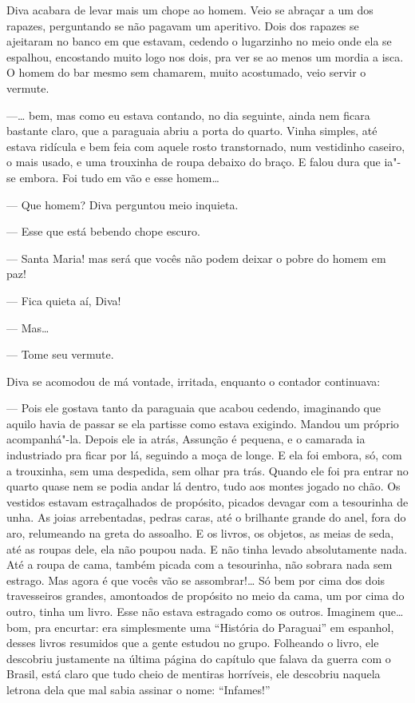 \begin{linenumbers}
Diva acabara de levar mais um chope ao homem. Veio se abraçar a um dos
rapazes, perguntando se não pagavam um aperitivo. Dois dos rapazes se
ajeitaram no banco em que estavam, cedendo o lugarzinho no meio onde ela
se espalhou, encostando muito logo nos dois, pra ver se ao menos um
mordia a isca. O homem do bar mesmo sem chamarem, muito acostumado, veio
servir o vermute.

---\ldots{} bem, mas como eu estava contando, no dia seguinte, ainda nem
ficara bastante claro, que a paraguaia abriu a porta do quarto. Vinha
simples, até estava ridícula e bem feia com aquele rosto transtornado,
num vestidinho caseiro, o mais usado, e uma trouxinha de roupa debaixo
do braço. E falou dura que ia"-se embora. Foi tudo em vão e esse homem\ldots{}

--- Que homem? Diva perguntou meio inquieta.

--- Esse que está bebendo chope escuro.

--- Santa Maria! mas será que vocês não podem deixar o pobre do homem em
paz!

--- Fica quieta aí, Diva!

--- Mas\ldots{}

--- Tome seu vermute.

Diva se acomodou de má vontade, irritada, enquanto o contador
continuava:

--- Pois ele gostava tanto da paraguaia que acabou cedendo, imaginando
que aquilo havia de passar se ela partisse como estava exigindo. Mandou
um próprio acompanhá"-la. Depois ele ia atrás, Assunção é pequena, e o
camarada ia industriado pra ficar por lá, seguindo a moça de longe. E
ela foi embora, só, com a trouxinha, sem uma despedida, sem olhar pra
trás. Quando ele foi pra entrar no quarto quase nem se podia andar lá
dentro, tudo aos montes jogado no chão. Os vestidos estavam
estraçalhados de propósito, picados devagar com a tesourinha de unha. As
joias arrebentadas, pedras caras, até o brilhante grande do anel, fora
do aro, relumeando na greta do assoalho. E os livros, os objetos, as
meias de seda, até as roupas dele, ela não poupou nada. E não tinha
levado absolutamente nada. Até a roupa de cama, também picada com a
tesourinha, não sobrara nada sem estrago. Mas agora é que vocês vão se
assombrar!\ldots{} Só bem por cima dos dois travesseiros grandes, amontoados
de propósito no meio da cama, um por cima do outro, tinha um livro. Esse
não estava estragado como os outros. Imaginem que\ldots{} bom, pra encurtar:
era simplesmente uma ``História do Paraguai'' em espanhol, desses livros
resumidos que a gente estudou no grupo. Folheando o livro, ele descobriu
justamente na última página do capítulo que falava da guerra com o
Brasil, está claro que tudo cheio de mentiras horríveis, ele descobriu
naquela letrona dela que mal sabia assinar o nome: ``Infames!''


\end{linenumbers}
